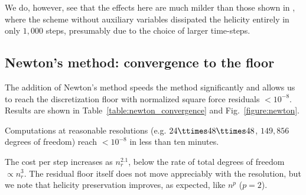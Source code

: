 \documentclass[%
 reprint,
 superscriptaddress,
 amsmath,amssymb,
 aps, nofootinbib, floatfix]{revtex4-2}
\begin{document}
\begin{table}[htb]
\caption{Helicity preservation, with and without correction term, throughout L-BFGS descent for different choices of precision.}

\label{table:helicity_preservation}
\end{table}

\begin{remark}
    We do, however, see that the effects here are much milder than those shown in \citep[Section 4.2.2]{he_topology-preserving_2025}, where the scheme without auxiliary variables dissipated the helicity entirely in only $1{,}000$ steps, presumably due to the choice of larger time-steps.
\end{remark}




\subsection{Newton's method: convergence to the floor}
\label{sec:numerics_newton}
The addition of Newton's method speeds the method significantly and allows us to reach the discretization floor with normalized square force residuals $< 10^{-8}$. Results are shown in Table~\ref{table:newton_convergence} and Fig.~\ref{figure:newton}. 

Computations at reasonable resolutions (e.g. $24\ttimes48\ttimes48$, $149{,}856$ degrees of freedom) reach $< 10^{-8}$ in less than ten minutes.

The cost per step increases as $n_r^{2.1}$, below the rate of total degrees of freedom $\propto n_r^3$. The residual floor itself does not move appreciably with the resolution, but we note that helicity preservation improves, as expected, like $n^p$ ($p=2$).
\end{document}
